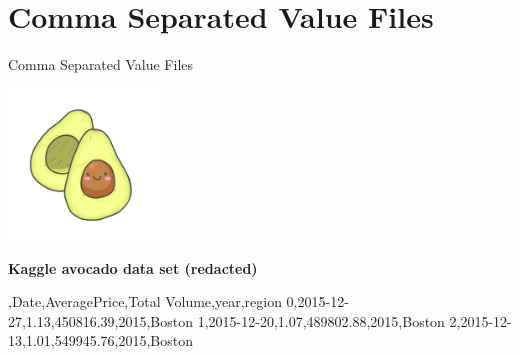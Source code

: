 \documentclass[
  american,
  ignorenonframetext,
]{beamer}
\begin{document}
\hypertarget{comma-separated-value-files}{%
\section{Comma Separated Value
Files}\label{comma-separated-value-files}}

\begin{frame}{Comma Separated Value Files}
\protect\hypertarget{comma-separated-value-files-1}{}

\includegraphics[width=0.3\textwidth,height=\textheight]{06_FileIO/avocado.png}

\textbf{Kaggle avocado data set (redacted)}

\begin{pythoncode}

,Date,AveragePrice,Total Volume,year,region
0,2015-12-27,1.13,450816.39,2015,Boston
1,2015-12-20,1.07,489802.88,2015,Boston
2,2015-12-13,1.01,549945.76,2015,Boston

\end{pythoncode}


\end{frame}
\end{document}
